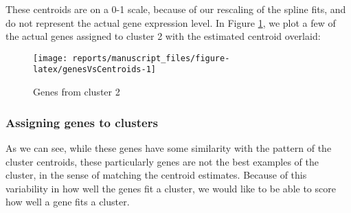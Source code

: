 \documentclass[9pt,a4paper,]{extarticle}
\newenvironment{Shaded}{\begin{snugshade}}{\end{snugshade}}
\newcommand{\DataTypeTok}[1]{\textcolor[rgb]{0.13,0.29,0.53}{#1}}
\newcommand{\DecValTok}[1]{\textcolor[rgb]{0.00,0.00,0.81}{#1}}
\newcommand{\FloatTok}[1]{\textcolor[rgb]{0.00,0.00,0.81}{#1}}
\newcommand{\KeywordTok}[1]{\textcolor[rgb]{0.13,0.29,0.53}{\textbf{#1}}}
\newcommand{\NormalTok}[1]{#1}
\newcommand{\OperatorTok}[1]{\textcolor[rgb]{0.81,0.36,0.00}{\textbf{#1}}}
\newcommand{\OtherTok}[1]{\textcolor[rgb]{0.56,0.35,0.01}{#1}}
\newcommand{\StringTok}[1]{\textcolor[rgb]{0.31,0.60,0.02}{#1}}
\begin{document}
These centroids are on a 0-1 scale, because of our rescaling of the spline
fits, and do not represent the actual gene expression level. In Figure \ref{fig:genesVsCentroids}, we plot a few
of the actual genes assigned to cluster 2 with the estimated centroid overlaid:

\begin{Shaded}
\end{Shaded}

\begin{figure}[H]

{\centering \texttt{[image: reports/manuscript\_files/figure-latex/genesVsCentroids-1]} 

}

\caption{Genes from cluster 2}\label{fig:genesVsCentroids}
\end{figure}

\hypertarget{assigning-genes-to-clusters}{%
\subsubsection{Assigning genes to clusters}\label{assigning-genes-to-clusters}}

As we can see, while these genes have some similarity with the pattern of the cluster centroids, these particularly genes are not the best examples of the cluster, in the sense of matching the centroid estimates. Because of this variability in how well the genes fit a cluster, we would like to be able to score how well a gene fits a cluster.
\end{document}
